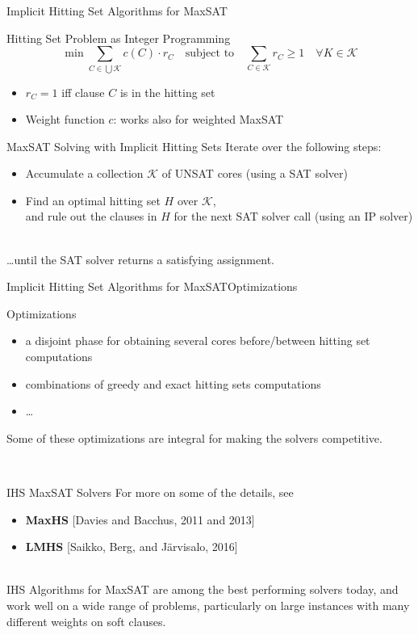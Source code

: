 \documentclass[t,english]{sdqbeamer}
\begin{document}
\begin{frame}{Implicit Hitting Set Algorithms for MaxSAT}
\begin{block}{Hitting Set Problem as Integer Programming}
$$
\min\sum_{C \in \bigcup \mathcal{K}} c(C) \cdot r_C \quad \text{subject to} \quad \sum_{C \in \mathcal{K}} r_C \geq 1 \quad \forall K \in \mathcal{K}
$$
\begin{itemize}\itemsep1ex
	\item $r_C = 1$ iff clause $C$ is in the hitting set
	\item Weight function $c$: works also for weighted MaxSAT
\end{itemize}
\end{block}
\begin{block}{MaxSAT Solving with Implicit Hitting Sets}
Iterate over the following steps:\\[1ex]
\begin{itemize}\itemsep1ex
	\item Accumulate a collection $\mathcal{K}$ of UNSAT cores
	\hfill (using a SAT solver)
	\item Find an optimal hitting set $H$ over $\mathcal{K}$,\\ 
	and rule out the clauses in $H$ for the next SAT solver call
	\hfill (using an IP solver)
\end{itemize}~\\
\dots until the SAT solver returns a satisfying assignment.
\end{block}
\end{frame}

\begin{frame}{Implicit Hitting Set Algorithms for MaxSAT}{Optimizations}
\begin{block}{Optimizations}
\begin{itemize}
	\item a disjoint phase for obtaining several cores before/between hitting set computations
	\item combinations of greedy and exact hitting sets computations
	\item \dots
\end{itemize}
Some of these optimizations are integral for making the solvers competitive.\\
\end{block}~\\
\begin{block}{IHS MaxSAT Solvers}
For more on some of the details, see
\begin{itemize}
	 \item \textbf{MaxHS} [Davies and Bacchus, 2011 and 2013]
	 \item \textbf{LMHS} [Saikko, Berg, and Järvisalo, 2016]
\end{itemize}~\\
IHS Algorithms for MaxSAT are among the best performing solvers today, and work well on a wide range of problems, particularly on large instances with many different weights on soft clauses.
\end{block}
\end{frame}
\end{document}
